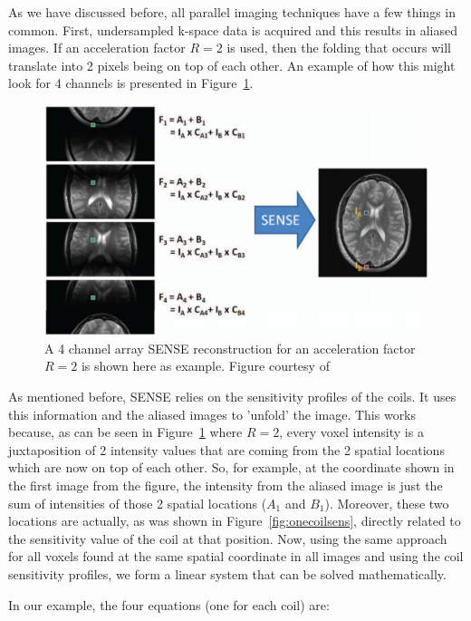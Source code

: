 As we have discussed before, all parallel imaging techniques have a few things in common. First, undersampled k-space data is acquired and this results in aliased images. If an acceleration factor $R = 2$ is used, then the folding that occurs will translate into 2 pixels being on top of each other. An example of how this might look for 4 channels is presented in Figure~\ref{fig:sense}.

\begin{figure}[ht]
    \centering
    \includegraphics[width=1\textwidth,keepaspectratio]{sense}
    \caption{A 4 channel array SENSE reconstruction for an acceleration factor $R = 2$ is shown here as example. Figure courtesy of \cite{Deshmane2012}}
    \label{fig:sense}
\end{figure}

As mentioned before, SENSE relies on the sensitivity profiles of the coils. It uses this information and the aliased images to 'unfold' the image. This works because, as can be seen in Figure~\ref{fig:sense} where $R = 2$, every voxel intensity is a juxtaposition of 2 intensity values that are coming from the 2 spatial locations which are now on top of each other. So, for example, at the coordinate shown in the first image from the figure, the intensity from the aliased image is just the sum of intensities of those 2 spatial locations ($A_1$ and $B_1$). Moreover, these two locations are actually, as was shown in Figure~\ref{fig:onecoilsens}, directly related to the sensitivity value of the coil at that position. Now, using the same approach for all voxels found at the same spatial coordinate in all images and using the coil sensitivity profiles, we form a linear system that can be solved mathematically.

In our example, the four equations (one for each coil) are:

